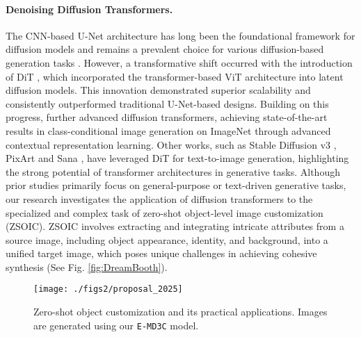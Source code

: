 \paragraph{Denoising Diffusion Transformers.}
The CNN-based U-Net architecture \cite{ronneberger2015u} has long been the foundational framework for diffusion models and remains a prevalent choice for various diffusion-based generation tasks \cite{ho2020denoising, ho2022cascaded, song2019generative}. However, a transformative shift occurred with the introduction of DiT \cite{peebles2023scalable}, which incorporated the transformer-based ViT architecture \cite{dosovitskiy2021an} into latent diffusion models. This innovation demonstrated superior scalability and consistently outperformed traditional U-Net-based designs. Building on this progress, \citet{gao2023masked} further advanced diffusion transformers, achieving state-of-the-art results in class-conditional image generation on ImageNet through advanced contextual representation learning. Other works, such as Stable Diffusion v3 \cite{esser2024scaling}, PixArt \cite{chen2025pixart} and Sana \cite{xie2025sana}, have leveraged DiT for text-to-image generation, highlighting the strong potential of transformer architectures in generative tasks. Although prior studies primarily focus on general-purpose or text-driven generative tasks, our research investigates the application of diffusion transformers to the specialized and complex task of zero-shot object-level image customization (ZSOIC). ZSOIC involves extracting and integrating intricate attributes from a source image, including object appearance, identity, and background, into a unified target image, which poses unique challenges in achieving cohesive synthesis \cite{ginesu2012objective, chen2024anydoor} (See Fig. \ref{fig:DreamBooth}).

\begin{figure*} %
  \centering
  \texttt{[image: ./figs2/proposal\_2025]}
  \vspace{-16pt}
  \caption{Zero-shot object customization and its practical applications. Images are generated using our \texttt{E-MD3C} model.}
  \label{fig:task}
  \vspace{-12pt}
\end{figure*}


